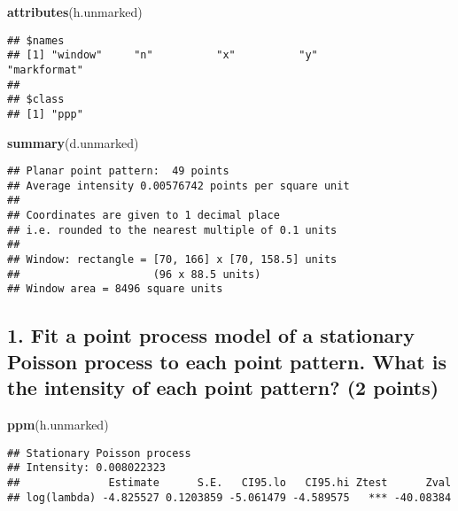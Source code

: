 \documentclass[]{article}
\newenvironment{Shaded}{\begin{snugshade}}{\end{snugshade}}
\newcommand{\KeywordTok}[1]{\textcolor[rgb]{0.13,0.29,0.53}{\textbf{#1}}}
\newcommand{\NormalTok}[1]{#1}
\begin{document}
\begin{Shaded}
\begin{Highlighting}[]
\KeywordTok{attributes}\NormalTok{(h.unmarked)}
\end{Highlighting}
\end{Shaded}

\begin{verbatim}
## $names
## [1] "window"     "n"          "x"          "y"          "markformat"
## 
## $class
## [1] "ppp"
\end{verbatim}

\begin{Shaded}
\begin{Highlighting}[]
\KeywordTok{summary}\NormalTok{(d.unmarked)}
\end{Highlighting}
\end{Shaded}

\begin{verbatim}
## Planar point pattern:  49 points
## Average intensity 0.00576742 points per square unit
## 
## Coordinates are given to 1 decimal place
## i.e. rounded to the nearest multiple of 0.1 units
## 
## Window: rectangle = [70, 166] x [70, 158.5] units
##                     (96 x 88.5 units)
## Window area = 8496 square units
\end{verbatim}

\hypertarget{fit-a-point-process-model-of-a-stationary-poisson-process-to-each-point-pattern.-what-is-the-intensity-of-each-point-pattern-2-points}{%
\subsection{1. Fit a point process model of a stationary Poisson process
to each point pattern. What is the intensity of each point pattern? (2
points)}\label{fit-a-point-process-model-of-a-stationary-poisson-process-to-each-point-pattern.-what-is-the-intensity-of-each-point-pattern-2-points}}

\begin{Shaded}
\begin{Highlighting}[]
\KeywordTok{ppm}\NormalTok{(h.unmarked)}
\end{Highlighting}
\end{Shaded}

\begin{verbatim}
## Stationary Poisson process
## Intensity: 0.008022323
##              Estimate      S.E.   CI95.lo   CI95.hi Ztest      Zval
## log(lambda) -4.825527 0.1203859 -5.061479 -4.589575   *** -40.08384
\end{verbatim}
\end{document}
